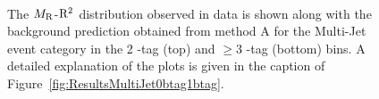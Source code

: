 \begin{figure}[!htb] \centering
{}\\
\caption{ The $M_\mathrm{R}$-$\mathrm{R}^2$ distribution observed in data is shown along with the background prediction
obtained from method A for the Multi-Jet event category in the 2 \PQb-tag (top) and $\geq 3$ \PQb-tag (bottom) bins. 
A detailed explanation of the plots is given in the caption of
  Figure~\ref{fig:ResultsMultiJet0btag1btag}.
}
\label{fig:ResultsMultiJet2btag3btag}
\end{figure}

